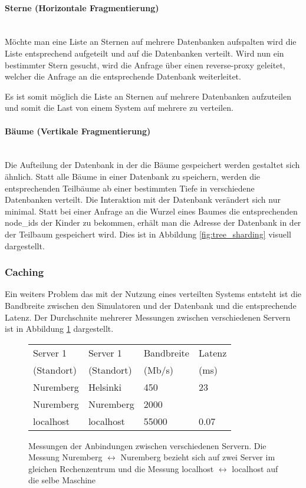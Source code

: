 \paragraph{Sterne (Horizontale Fragmentierung)} ~\\
Möchte man eine Liste an Sternen auf mehrere Datenbanken aufspalten wird die
Liste entsprechend aufgeteilt und auf die Datenbanken verteilt. Wird nun ein
bestimmter Stern gesucht, wird die Anfrage über einen reverse-proxy geleitet,
welcher die Anfrage an die entsprechende Datenbank weiterleitet.

\par Es ist somit möglich die Liste an Sternen auf mehrere Datenbanken
aufzuteilen und somit die Last von einem System auf mehrere zu verteilen.

\paragraph{Bäume (Vertikale Fragmentierung)} ~\\
Die Aufteilung der Datenbank in der die Bäume gespeichert werden gestaltet sich
ähnlich. Statt alle Bäume in einer Datenbank zu speichern, werden die
entsprechenden Teilbäume ab einer bestimmten Tiefe in verschiedene Datenbanken
verteilt. Die Interaktion mit der Datenbank verändert sich nur minimal. Statt
bei einer Anfrage an die Wurzel eines Baumes die entsprechenden node\_ids der
Kinder zu bekommen, erhält man die Adresse der Datenbank in der der Teilbaum
gespeichert wird. Dies ist in Abbildung \ref{fig:tree_sharding} visuell dargestellt.

\subsubsection{Caching}
Ein weiters Problem das mit der Nutzung eines verteilten Systems entsteht ist
die Bandbreite zwischen den Simulatoren und der Datenbank und die entsprechende
Latenz. Der Durchschnite mehrerer Messungen zwischen verschiedenen Servern ist
in Abbildung \ref{fig:bandwidth_latency} dargestellt.

\begin{figure}
    \centering
    \begin{tabular} {l | l | l | l}
        Server 1 & Server 1 & Bandbreite & Latenz \\
        (Standort) & (Standort) & (Mb/s) & (ms) \\ \hline\hline
        Nuremberg & Helsinki & 450 & 23 \\ \hline
        Nuremberg & Nuremberg & 2000 & \\ \hline
        localhost & localhost & 55000 & 0.07 \\ \hline
    \end{tabular}
    \caption{Messungen der Anbindungen zwischen verschiedenen Servern. Die Messung
    Nuremberg \( \leftrightarrow \) Nuremberg bezieht sich auf zwei Server im
    gleichen Rechenzentrum und die Messung localhost \( \leftrightarrow \)
    localhost auf die selbe Maschine}
    \label{fig:bandwidth_latency}
\end{figure}

